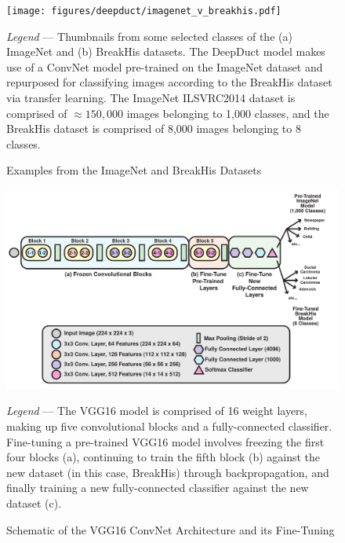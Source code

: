 \begin{figure}[h]
	\begin{center}
		\caption{Examples from the ImageNet and BreakHis Datasets \label{fig:imagenet_v_breakhis}}
	\end{center}
	\texttt{[image: figures/deepduct/imagenet\_v\_breakhis.pdf]}
	\begin{singlespace}
		\textit{Legend} --- Thumbnails from some selected classes of the (a) ImageNet and (b) BreakHis datasets. The DeepDuct model makes use of a ConvNet model pre-trained on the ImageNet dataset and repurposed for classifying images according to the BreakHis dataset via transfer learning. The ImageNet ILSVRC2014 dataset is comprised of $\approx150,000$ images belonging to 1,000 classes, and the BreakHis dataset is comprised of 8,000 images belonging to 8 classes. 
	\end{singlespace}
	
\end{figure}

\begin{figure}[h]
	\begin{center}
		\caption{Schematic of the VGG16 ConvNet Architecture and its Fine-Tuning \label{fig:vgg_arch}}
	\end{center}
	\includegraphics[width=160mm]{figures/deepduct/vgg_overview.pdf}
	\begin{singlespace}
		\textit{Legend} --- The VGG16 model is comprised of 16 weight layers, making up five convolutional blocks and a fully-connected classifier. Fine-tuning a pre-trained VGG16 model involves freezing the first four blocks (a), continuing to train the fifth block (b) against the new dataset (in this case, BreakHis) through backpropagation, and finally training a new fully-connected classifier against the new dataset (c).
	\end{singlespace}
	
\end{figure}